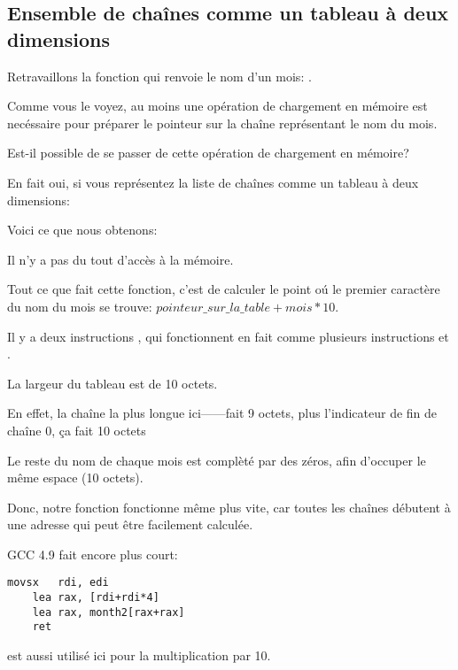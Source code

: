\subsection{Ensemble de chaînes comme un tableau à deux dimensions}

Retravaillons la fonction qui renvoie le nom d'un mois: .

Comme vous le voyez, au moins une opération de chargement en mémoire est necéssaire
pour préparer le pointeur sur la chaîne représentant le nom du mois.

Est-il possible de se passer de cette opération de chargement en mémoire?

En fait oui, si vous représentez la liste de chaînes comme un tableau à deux dimensions:



Voici ce que nous obtenons:



Il n'y a pas du tout d'accès à la mémoire.

Tout ce que fait cette fonction, c'est de calculer le point oú le premier caractère
du nom du mois se trouve:
$pointeur\_sur\_la\_table + mois * 10$.

Il y a deux instructions \LEA, qui fonctionnent en fait comme plusieurs instructions
\MUL et \MOV.

La largeur du tableau est de 10 octets.

En effet, la chaîne la plus longue ici------fait 9 octets, plus l'indicateur
de fin de chaîne 0, ça fait 10 octets

Le reste du nom de chaque mois est complèté par des zéros, afin d'occuper le même
espace (10 octets).

Donc, notre fonction fonctionne même plus vite, car toutes les chaînes débutent à
une adresse qui peut être facilement calculée.

GCC 4.9 \Optimizing fait encore plus court:

\begin{lstlisting}[caption=GCC 4.9 x64 \Optimizing,style=customasmx86]
	movsx	rdi, edi
	lea	rax, [rdi+rdi*4]
	lea	rax, month2[rax+rax]
	ret
\end{lstlisting}

\LEA est aussi utilisé ici pour la multiplication par 10.

